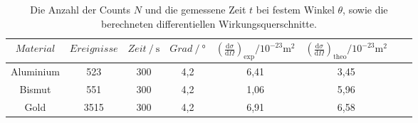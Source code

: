 \begin{table}[H] 
   \centering 
   \caption{Die Anzahl der Counts $N$ und die gemessene Zeit $t$ bei festem
   Winkel $\theta$, sowie die berechneten differentiellen Wirkungsquerschnitte.} 
   \label{tab:zWerte2} 
   \begin{tabular} { c c c c c c c c } 
 \toprule 
 {$Material$}  & {$Ereignisse$} & {$Zeit\:/\: \mathrm{s}$} & {$Grad\:/\: \mathrm{°}$} & {$\left(\frac{\mathrm{d}\sigma}{\mathrm{d}\Omega}\right)_\text{exp}/10^{-23}\si{\meter^2}$} & {$\left(\frac{\mathrm{d}\sigma}{\mathrm{d}\Omega}\right)_\text{theo}/10^{-23}\si{\meter^2}$}\\ 
    \midrule 
    Aluminium  & 523 & 300 & 4,2 & 6,41 & 3,45 \\ 
    Bismut  & 551 & 300 & 4,2 & 1,06 & 5,96  \\ 
    Gold & 3515 & 300 & 4,2  & 6,91 & 6,58 \\ 
    \bottomrule 
  \end{tabular}
\end{table}